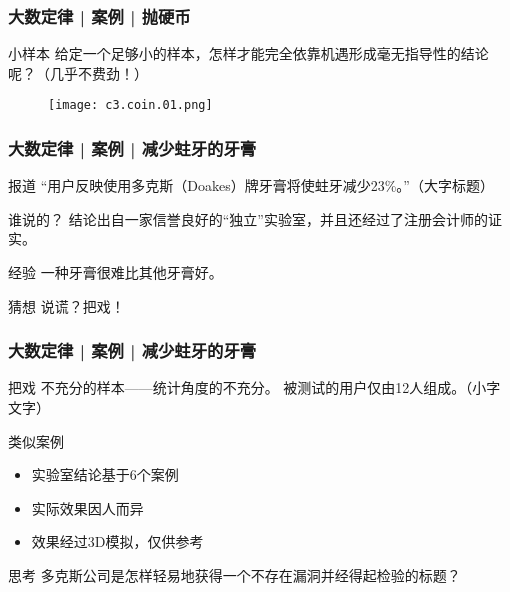 \begin{frame}
  \frametitle{大数定律 | 案例 | 抛硬币}
  \begin{block}{小样本}
    给定一个足够小的样本，怎样才能完全依靠机遇形成毫无指导性的结论呢？（几乎不费劲！）
  \end{block}
  \begin{figure}
    \centering
    \texttt{[image: c3.coin.01.png]}
  \end{figure}
\end{frame}

\begin{frame}
  \frametitle{大数定律 | 案例 | 减少蛀牙的牙膏}
  \begin{block}{报道}
    “用户反映使用多克斯（Doakes）牌牙膏将使蛀牙减少23\%。”（大字标题）
  \end{block}
  \pause
  \begin{block}{谁说的？}
    结论出自一家信誉良好的“独立”实验室，并且还经过了注册会计师的证实。
  \end{block}
  \pause
  \begin{block}{经验}
    一种牙膏很难比其他牙膏好。
  \end{block}
  \pause
  \begin{block}{猜想}
    说谎？把戏！
  \end{block}
\end{frame}

\begin{frame}
  \frametitle{大数定律 | 案例 | 减少蛀牙的牙膏}
  \begin{block}{把戏}
    不充分的样本——统计角度的不充分。
    被测试的用户仅由12人组成。（小字文字）
  \end{block}
  \pause
  \begin{block}{类似案例}
    \begin{itemize}
      \item 实验室结论基于6个案例
      \item 实际效果因人而异
      \item 效果经过3D模拟，仅供参考
    \end{itemize}
  \end{block}
  \pause
  \begin{block}{思考}
    多克斯公司是怎样轻易地获得一个不存在漏洞并经得起检验的标题？
  \end{block}
\end{frame}

